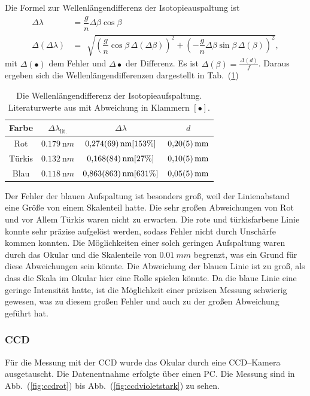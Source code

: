 \documentclass[sn-mathphys-num,iicol]{sn-jnl}
\theoremstyle{thmstyleone}
\theoremstyle{thmstyletwo}
\theoremstyle{thmstylethree}
\begin{document}
Die Formel zur Wellenlängendifferenz der Isotopieauspaltung ist
\begin{align} 
        \Delta \lambda &=\dfrac{g}{n}\Delta \beta \cos \beta\\
        \Delta \left(\Delta \lambda \right) &= \,\sqrt[]{\left(\dfrac{g}{n}\cos \beta \,\Delta \left(\Delta \beta \right)\right)^2+\left(-\dfrac{g}{n}\Delta \beta \sin \beta \,\Delta \left(\beta \right)\right)^2}
,\end{align} 
mit $\Delta \left(\bullet\right)$ dem Fehler und $\Delta \bullet $ der Differenz.
Es ist $\Delta (\beta) =\tfrac{\Delta (d)}{f}$.
Daraus ergeben sich die Wellenlängendifferenzen dargestellt in Tab.\ (\ref{tab:isotopie_okular})

\begin{table}[h]
        \begin{tabular}{cccc}
                Farbe & $\Delta \lambda _\text{lit.}$ & $\Delta \lambda $ &  $d$ \\
                \hline
                Rot & $\SI{0.179}{\nano m}$& $\SI{0.274+-0.069}{\nano m}[153\%]$  & $\SI{0.2+-0.05}{mm}$ \\
                Türkis& $\SI{0.132}{\nano m}$ & $\SI{0.168+-0.084}{\nano m}[27\%]$  & $\SI{0.1+-0.05}{mm}$ \\
                Blau & $\SI{0.118}{\nano m}$& $\SI{0.863+-0.863}{\nano m}[631\%]$  & $\SI{0.05+-0.05}{mm}$ 
        \end{tabular}
        \caption{Die Wellenlängendifferenz der Isotopieaufspaltung. Literaturwerte aus \cite{LeyboldBalmerserieBeobachtung} mit Abweichung in Klammern $[\bullet ]$.} \label{tab:isotopie_okular}
\end{table}
Der Fehler der blauen Aufspaltung ist besonders groß, weil der Linienabstand eine Größe von einem Skalenteil hatte.
Die sehr großen Abweichungen von Rot und vor Allem Türkis waren nicht zu erwarten.
Die rote und türkisfarbene Linie konnte sehr präzise aufgelöst werden, sodass Fehler nicht durch Unschärfe kommen konnten.
Die Möglichkeiten einer solch geringen Aufspaltung waren durch das Okular und die Skalenteile von $\SI{0.01}{mm}$ begrenzt, was ein Grund für diese Abweichungen sein könnte.
Die Abweichung der blauen Linie ist zu groß, als dass die Skala im Okular hier eine Rolle spielen könnte.
Da die blaue Linie eine geringe Intensität hatte, ist die Möglichkeit einer präzisen Messung schwierig gewesen, was zu diesem großen Fehler und auch zu der großen Abweichung geführt hat.

\subsubsection{CCD}
Für die Messung mit der CCD wurde das Okular durch eine CCD--Kamera ausgetauscht.
Die Datenentnahme erfolgte über einen PC.
Die Messung sind in Abb.\ (\ref{fig:ccdrot}) bis Abb.\ (\ref{fig:ccdvioletstark}) zu sehen.
\end{document}

